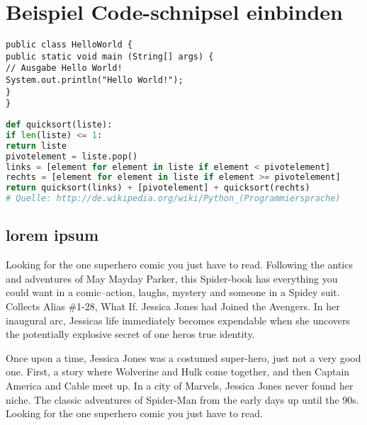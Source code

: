
\chapter{Beispiel Code-schnipsel einbinden}


\begin{lstlisting}[caption=Code-Beispiel, label=Bsp.1]
public class HelloWorld {
public static void main (String[] args) {
// Ausgabe Hello World!
System.out.println("Hello World!");
}
}
\end{lstlisting}

\begin{lstlisting}[caption=Python-Code, label=Python-Code, title=Titel des Python-Codes,language=Python]
def quicksort(liste):
if len(liste) <= 1:
return liste
pivotelement = liste.pop()
links = [element for element in liste if element < pivotelement]
rechts = [element for element in liste if element >= pivotelement]
return quicksort(links) + [pivotelement] + quicksort(rechts)
# Quelle: http://de.wikipedia.org/wiki/Python_(Programmiersprache)
\end{lstlisting}

\section{lorem ipsum}
Looking for the one superhero comic you just have to read. Following the antics and adventures of May Mayday Parker, this Spider-book has everything you could want in a comic--action, laughs, mystery and someone in a Spidey suit. Collects Alias \#1-28, What If. Jessica Jones had Joined the Avengers. In her inaugural arc, Jessicas life immediately becomes expendable when she uncovers the potentially explosive secret of one heros true identity.

Once upon a time, Jessica Jones was a costumed super-hero, just not a very good one. First, a story where Wolverine and Hulk come together, and then Captain America and Cable meet up. In a city of Marvels, Jessica Jones never found her niche. The classic adventures of Spider-Man from the early days up until the 90s. Looking for the one superhero comic you just have to read.

